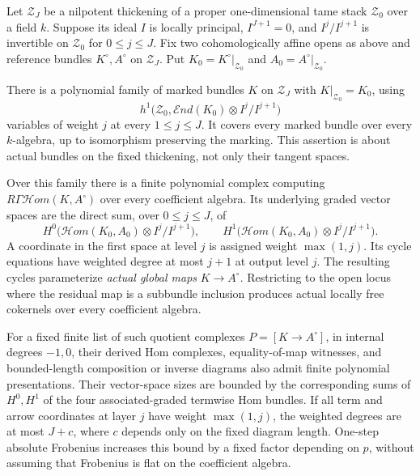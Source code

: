 \begin{lemma}
\label{D:weighted-fixed-residual-bundle-deformations}
Let $\mathcal Z_J$ be a nilpotent thickening of a proper
one-dimensional tame stack $\mathcal Z_0$ over a field $k$.
Suppose its ideal $I$ is locally principal, $I^{J+1}=0$, and
$I^j/I^{j+1}$ is invertible on $\mathcal Z_0$ for $0\leq j\leq J$.
Fix two cohomologically affine opens as above and reference bundles
$K^\circ,A^\circ$ on $\mathcal Z_J$. Put $K_0=K^\circ|_{\mathcal Z_0}$
and $A_0=A^\circ|_{\mathcal Z_0}$.

There is a polynomial family of marked bundles $K$ on
$\mathcal Z_J$ with $K|_{\mathcal Z_0}=K_0$, using
\[
       h^1\bigl(\mathcal Z_0,
          \mathcal End(K_0)\otimes I^j/I^{j+1}\bigr)
                                                        \tag{D.WF.1}
\]
variables of weight $j$ at every $1\leq j\leq J$.
It covers every marked bundle over every $k$-algebra, up to
isomorphism preserving the marking. This assertion is about
actual bundles on the fixed thickening, not only their tangent
spaces.

Over this family there is a finite polynomial complex computing
$R\Gamma\mathcal Hom(K,A^\circ)$ over every coefficient algebra.
Its underlying graded vector spaces are the direct sum, over
$0\leq j\leq J$, of
\[
 H^0\bigl(\mathcal Hom(K_0,A_0)\otimes I^j/I^{j+1}\bigr),\qquad
 H^1\bigl(\mathcal Hom(K_0,A_0)\otimes I^j/I^{j+1}\bigr).
                                                        \tag{D.WF.2}
\]
A coordinate in the first space at level $j$ is assigned weight
$\max(1,j)$. Its cycle equations have weighted degree at most
$j+1$ at output level $j$. The resulting cycles parameterize
\emph{actual global maps} $K\to A^\circ$. Restricting to the open
locus where the residual map is a subbundle inclusion produces
actual locally free cokernels over every coefficient algebra.

For a fixed finite list of such quotient complexes
$P=[K\to A^\circ]$, in internal degrees $-1,0$, their derived
Hom complexes, equality-of-map witnesses, and bounded-length
composition or inverse diagrams also admit finite polynomial
presentations. Their vector-space sizes are bounded by the
corresponding sums of $H^0,H^1$ of the four associated-graded
termwise Hom bundles. If all term and arrow coordinates at layer
$j$ have weight $\max(1,j)$, the weighted degrees are at most
$J+c$, where $c$ depends only on the fixed diagram length.
One-step absolute Frobenius increases this bound by a fixed
factor depending on $p$, without assuming that Frobenius is flat
on the coefficient algebra.
\end{lemma}

